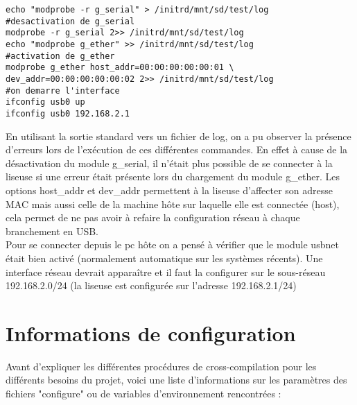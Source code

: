 \begin{lstlisting}
echo "modprobe -r g_serial" > /initrd/mnt/sd/test/log
#desactivation de g_serial
modprobe -r g_serial 2>> /initrd/mnt/sd/test/log
echo "modprobe g_ether" >> /initrd/mnt/sd/test/log
#activation de g_ether
modprobe g_ether host_addr=00:00:00:00:00:01 \
dev_addr=00:00:00:00:00:02 2>> /initrd/mnt/sd/test/log
#on demarre l'interface
ifconfig usb0 up
ifconfig usb0 192.168.2.1
\end{lstlisting}		

En utilisant la sortie standard vers un fichier de log, on a pu observer la présence d'erreurs lors de l'exécution de ces différentes commandes. En effet à cause de la désactivation du module g_serial, il n'était plus possible de se connecter à la liseuse si une erreur était présente lors du chargement du module g_ether.
Les options host_addr et dev_addr permettent à la liseuse d'affecter son adresse MAC mais aussi celle de la machine hôte sur laquelle elle est connectée (host), cela permet de ne pas avoir à refaire la configuration réseau à chaque branchement en USB.	\\
	Pour se connecter depuis le pc hôte on a pensé à vérifier que le module usbnet était bien activé (normalement automatique sur les systèmes récents).	
	Une interface réseau devrait apparaître et il faut la configurer sur le sous-réseau 192.168.2.0/24 (la liseuse est configurée sur l'adresse 192.168.2.1/24)

\newpage

\section{Informations de configuration}

Avant d'expliquer les différentes procédures de cross-compilation pour les différents besoins du projet, voici une liste d'informations sur les paramètres des fichiers "configure" ou de variables d'environnement rencontrées :

